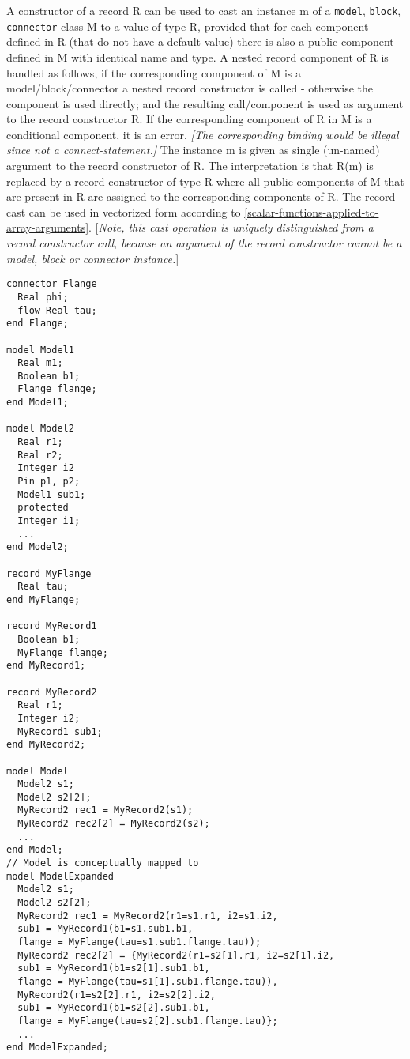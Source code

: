 A constructor of a record R can be used to cast an instance m of a
\lstinline!model!, \lstinline!block!, \lstinline!connector! class M to a value of type R, provided that for
each component defined in R (that do not have a default value) there is
also a public component defined in M with identical name and type. A
nested record component of R is handled as follows, if the corresponding
component of M is a model/block/connector a nested record constructor is
called - otherwise the component is used directly; and the resulting
call/component is used as argument to the record constructor R. If the
corresponding component of R in M is a conditional component, it is an
error. \emph{{[}The corresponding binding would be illegal since not a
connect-statement.{]}} The instance m is given as single (un-named)
argument to the record constructor of R. The interpretation is that R(m)
is replaced by a record constructor of type R where all public
components of M that are present in R are assigned to the corresponding
components of R. The record cast can be used in vectorized form
according to \autoref{scalar-functions-applied-to-array-arguments}. {[}\emph{Note, this cast operation is
uniquely distinguished from a record constructor call, because an
argument of the record constructor cannot be a model, block or connector
instance.}{]}

\begin{example}
\begin{lstlisting}[language=modelica]
connector Flange
  Real phi;
  flow Real tau;
end Flange;

model Model1
  Real m1;
  Boolean b1;
  Flange flange;
end Model1;

model Model2
  Real r1;
  Real r2;
  Integer i2
  Pin p1, p2;
  Model1 sub1;
  protected
  Integer i1;
  ...
end Model2;

record MyFlange
  Real tau;
end MyFlange;

record MyRecord1
  Boolean b1;
  MyFlange flange;
end MyRecord1;

record MyRecord2
  Real r1;
  Integer i2;
  MyRecord1 sub1;
end MyRecord2;

model Model
  Model2 s1;
  Model2 s2[2];
  MyRecord2 rec1 = MyRecord2(s1);
  MyRecord2 rec2[2] = MyRecord2(s2);
  ...
end Model;
// Model is conceptually mapped to
model ModelExpanded
  Model2 s1;
  Model2 s2[2];
  MyRecord2 rec1 = MyRecord2(r1=s1.r1, i2=s1.i2,
  sub1 = MyRecord1(b1=s1.sub1.b1,
  flange = MyFlange(tau=s1.sub1.flange.tau));
  MyRecord2 rec2[2] = {MyRecord2(r1=s2[1].r1, i2=s2[1].i2,
  sub1 = MyRecord1(b1=s2[1].sub1.b1,
  flange = MyFlange(tau=s1[1].sub1.flange.tau)),
  MyRecord2(r1=s2[2].r1, i2=s2[2].i2,
  sub1 = MyRecord1(b1=s2[2].sub1.b1,
  flange = MyFlange(tau=s2[2].sub1.flange.tau)};
  ...
end ModelExpanded;
\end{lstlisting}
\end{example}

